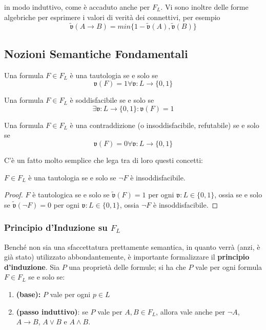 \noindent
in modo induttivo, come è accaduto anche per $F_L$.
Vi sono inoltre delle forme algebriche per esprimere i valori di verità dei connettivi, 
per esempio 
$$
\widetilde{\mathfrak{v}}(A \rightarrow B) = min\{1-\widetilde{\mathfrak{v}}(A), \widetilde{\mathfrak{v}}(B)\}
$$
\subsection{Nozioni Semantiche Fondamentali}

\begin{defi}[Tautologia]
Una formula $F \in F_L$ è una tautologia se e solo se 
$$
\mathfrak{v}(F) = 1 \forall \mathfrak{v} : L \rightarrow \{0,1\}
$$
\end{defi}
\begin{defi}
Una formula $F \in F_L$ è soddisfacibile se e solo se 
$$
\exists \mathfrak{v}:L \rightarrow \{0,1\} : \mathfrak{v}(F) = 1
$$
\end{defi}
\begin{defi}[Contraddizione]
Una formula $F \in F_L$ è una contraddizione (o insoddisfacibile, refutabile) se e solo 
se 
$$
\mathfrak{v}(F) = 0 \forall \mathfrak{v}: L \rightarrow \{0,1\}
$$
\end{defi}
C'è un fatto molto semplice che lega tra di loro questi concetti: 
\begin{teon}
$F \in F_L$ è una tautologia se e solo se $\neg F$ è insoddisfacibile. 
\end{teon}
\begin{proof}
  $F$ è tautologica se e solo se $\widetilde{\mathfrak{v}}(F) = 1$ per 
  ogni $\mathfrak{v}: L \in \{0,1\}$, ossia se e solo se $\widetilde{\mathfrak{v}}(\neg F) 
  = 0$ per ogni $\mathfrak{v}: L \in \{0,1\}$, ossia $\neg F$ è insoddisfacibile. 
\end{proof}

\subsubsection{Principio d'Induzione su $F_L$}
Benché non sia una sfaccettatura prettamente semantica, in quanto verrà 
(anzi, è già stato) utilizzato abbondantemente, è importante formalizzare 
il  \textbf{principio d'induzione}. Sia 
$P$ una proprietà delle formule; si ha che 
$P$ vale per ogni formula $F \in F_L$ se e solo se: 
\begin{enumerate}
  \item \textbf{(base):} $P$ vale per ogni $p \in L$
  \item \textbf{(passo induttivo)}: se $P$ vale per $A,B  \in F_L$, allora 
    vale anche per $\neg A$, $A \rightarrow B$, $A \lor B$ e $A \land B$. 
\end{enumerate}

